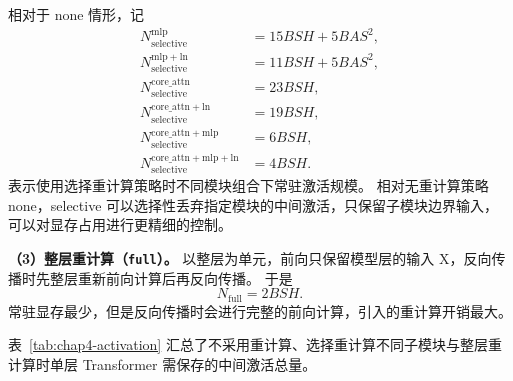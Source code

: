 相对于 none 情形，记
\begin{align}
  N_{\mathrm{selective}}^{\mathrm{mlp}} &= 15 B S H + 5 B A S^2, \\
  N_{\mathrm{selective}}^{\mathrm{mlp+ln}} &= 11 B S H + 5 B A S^2, \\
  N_{\mathrm{selective}}^{\mathrm{core\_attn}} &= 23 B S H, \\
  N_{\mathrm{selective}}^{\mathrm{core\_attn+ln}} &= 19 B S H, \\
  N_{\mathrm{selective}}^{\mathrm{core\_attn+mlp}} &= 6 B S H, \\
  N_{\mathrm{selective}}^{\mathrm{core\_attn+mlp+ln}} &= 4 B S H.
\end{align}
表示使用选择重计算策略时不同模块组合下常驻激活规模。
相对无重计算策略 none，selective 可以选择性丢弃指定模块的中间激活，只保留子模块边界输入，可以对显存占用进行更精细的控制。

\textbf{（3）整层重计算（\texttt{full}）。} 以整层为单元，前向只保留模型层的输入 X，反向传播时先整层重新前向计算后再反向传播。
于是
\begin{equation}
  N_{\mathrm{full}} = 2 B S H.
\end{equation}
常驻显存最少，但是反向传播时会进行完整的前向计算，引入的重计算开销最大。

表~\ref{tab:chap4-activation} 汇总了不采用重计算、选择重计算不同子模块与整层重计算时单层 Transformer 需保存的中间激活总量。

